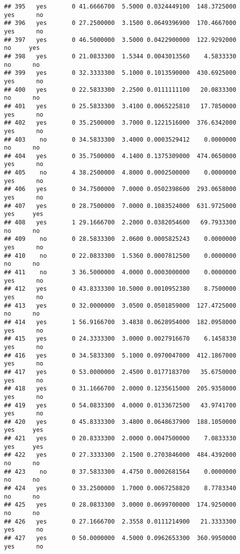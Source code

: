 \documentclass[]{article}
\begin{document}
\begin{verbatim}
## 395   yes       0 41.6666700  5.5000 0.0324449100  148.3725000   yes      no
## 396   yes       0 27.2500000  3.1500 0.0649396900  170.4667000   yes      no
## 397   yes       0 46.5000000  3.5000 0.0422900000  122.9292000    no     yes
## 398   yes       0 21.0833300  1.5344 0.0043013560    4.5833330    no      no
## 399   yes       0 32.3333300  5.1000 0.1013590000  430.6925000   yes      no
## 400   yes       0 22.5833300  2.2500 0.0111111100   20.0833300    no      no
## 401   yes       0 25.5833300  3.4100 0.0065225810   17.7850000   yes      no
## 402   yes       0 35.2500000  3.7000 0.1221516000  376.6342000   yes      no
## 403    no       0 34.5833300  3.4000 0.0003529412    0.0000000    no      no
## 404   yes       0 35.7500000  4.1400 0.1375309000  474.0650000   yes      no
## 405    no       4 38.2500000  4.8000 0.0002500000    0.0000000   yes      no
## 406   yes       0 34.7500000  7.0000 0.0502398600  293.0658000   yes      no
## 407   yes       0 28.7500000  7.0000 0.1083524000  631.9725000   yes     yes
## 408   yes       1 29.1666700  2.2000 0.0382054600   69.7933300    no      no
## 409    no       0 28.5833300  2.0600 0.0005825243    0.0000000   yes      no
## 410    no       0 22.0833300  1.5360 0.0007812500    0.0000000    no      no
## 411    no       3 36.5000000  4.0000 0.0003000000    0.0000000   yes      no
## 412   yes       0 43.8333300 10.5000 0.0010952380    8.7500000   yes      no
## 413   yes       0 32.0000000  3.0500 0.0501859000  127.4725000    no      no
## 414   yes       1 56.9166700  3.4838 0.0628954000  182.0958000   yes      no
## 415   yes       0 24.3333300  3.0000 0.0027916670    6.1458330   yes      no
## 416   yes       0 34.5833300  5.1000 0.0970047000  412.1867000   yes      no
## 417   yes       0 53.0000000  2.4500 0.0177183700   35.6750000   yes      no
## 418   yes       0 31.1666700  2.0000 0.1235615000  205.9358000   yes      no
## 419   yes       0 54.0833300  4.0000 0.0133672500   43.9741700   yes      no
## 420   yes       0 45.8333300  3.4800 0.0648637900  188.1050000   yes     yes
## 421   yes       0 20.8333300  2.0000 0.0047500000    7.0833330   yes     yes
## 422   yes       0 27.3333300  2.1500 0.2703846000  484.4392000    no      no
## 423    no       0 37.5833300  4.4750 0.0002681564    0.0000000    no      no
## 424   yes       0 33.2500000  1.7000 0.0067258820    8.7783340    no      no
## 425   yes       0 28.0833300  3.0000 0.0699700000  174.9250000    no      no
## 426   yes       0 27.1666700  2.3558 0.0111214900   21.3333300   yes      no
## 427   yes       0 50.0000000  4.5000 0.0962653300  360.9950000   yes      no

\end{verbatim}
\end{document}
